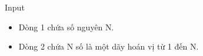 Input
\begin{itemize}
	\item Dòng 1 chứa số nguyên N.
	\item Dòng 2 chứa N số là một dãy hoán vị từ 1 đến N.
\end{itemize}